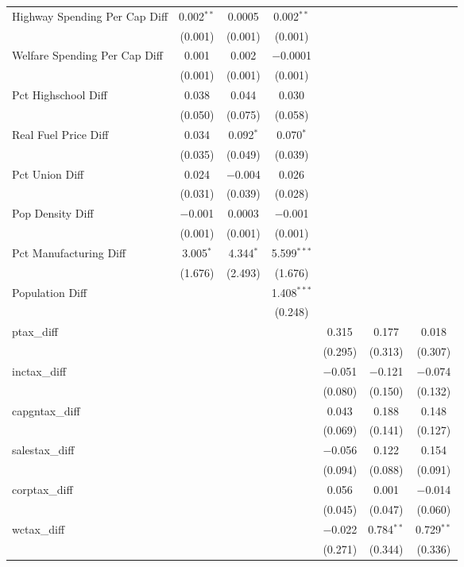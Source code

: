 \begin{table}[!htbp]
\begin{tabular}{@{\extracolsep{5pt}}lcccccc}
  Highway Spending Per Cap Diff & 0.002$^{**}$ & 0.0005 & 0.002$^{**}$ &  &  &  \\ 
  & (0.001) & (0.001) & (0.001) &  &  &  \\ 
  Welfare Spending Per Cap Diff & 0.001 & 0.002 & $-$0.0001 &  &  &  \\ 
  & (0.001) & (0.001) & (0.001) &  &  &  \\ 
  Pct Highschool Diff & 0.038 & 0.044 & 0.030 &  &  &  \\ 
  & (0.050) & (0.075) & (0.058) &  &  &  \\ 
  Real Fuel Price Diff & 0.034 & 0.092$^{*}$ & 0.070$^{*}$ &  &  &  \\ 
  & (0.035) & (0.049) & (0.039) &  &  &  \\ 
  Pct Union Diff & 0.024 & $-$0.004 & 0.026 &  &  &  \\ 
  & (0.031) & (0.039) & (0.028) &  &  &  \\ 
  Pop Density Diff & $-$0.001 & 0.0003 & $-$0.001 &  &  &  \\ 
  & (0.001) & (0.001) & (0.001) &  &  &  \\ 
  Pct Manufacturing Diff & 3.005$^{*}$ & 4.344$^{*}$ & 5.599$^{***}$ &  &  &  \\ 
  & (1.676) & (2.493) & (1.676) &  &  &  \\ 
  Population Diff &  &  & 1.408$^{***}$ &  &  &  \\ 
  &  &  & (0.248) &  &  &  \\ 
  ptax\_diff &  &  &  & 0.315 & 0.177 & 0.018 \\ 
  &  &  &  & (0.295) & (0.313) & (0.307) \\ 
  inctax\_diff &  &  &  & $-$0.051 & $-$0.121 & $-$0.074 \\ 
  &  &  &  & (0.080) & (0.150) & (0.132) \\ 
  capgntax\_diff &  &  &  & 0.043 & 0.188 & 0.148 \\ 
  &  &  &  & (0.069) & (0.141) & (0.127) \\ 
  salestax\_diff &  &  &  & $-$0.056 & 0.122 & 0.154 \\ 
  &  &  &  & (0.094) & (0.088) & (0.091) \\ 
  corptax\_diff &  &  &  & 0.056 & 0.001 & $-$0.014 \\ 
  &  &  &  & (0.045) & (0.047) & (0.060) \\ 
  wctax\_diff &  &  &  & $-$0.022 & 0.784$^{**}$ & 0.729$^{**}$ \\ 
  &  &  &  & (0.271) & (0.344) & (0.336) \\ 

\end{tabular}
\end{table}
